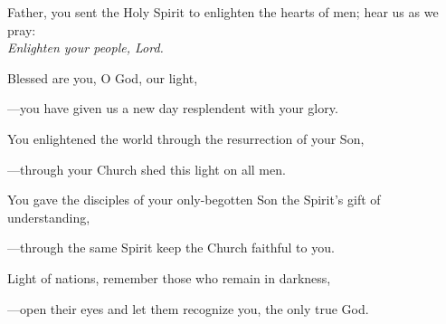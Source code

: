 \intercessions\indent

\begin{hangpar}

Father, you sent the Holy Spirit to enlighten the hearts of men; hear us as we pray:\\
\emph{Enlighten your people, Lord.}

\medskip Blessed are you, O God, our light,

{\color{red}---\thinspace}you have given us a new day resplendent with your glory.

\medskip You enlightened the world through the resurrection of your Son,

{\color{red}---\thinspace}through your Church shed this light on all men.

\medskip You gave the disciples of your only-begotten Son the Spirit’s gift of understanding,

{\color{red}---\thinspace}through the same Spirit keep the Church faithful to you.

\medskip Light of nations, remember those who remain in darkness,

{\color{red}---\thinspace}open their eyes and let them recognize you, the only true God.

\end{hangpar}

